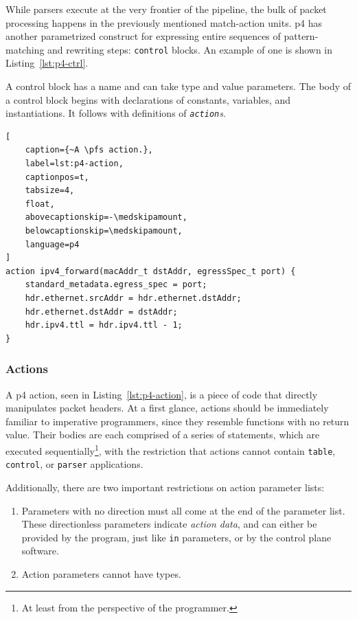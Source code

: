 While parsers execute at the very frontier of the pipeline, the bulk of packet
processing happens in the previously mentioned match-action units. \acrshort{p4}
has another parametrized construct for expressing entire sequences of
pattern-matching and rewriting steps: \texttt{control} blocks. An example of one
is shown in Listing~\ref{lst:p4-ctrl}.

A control block has a name and can take type and value parameters. The body of a
control block begins with declarations of constants, variables, and
instantiations. It follows with definitions of \emph{\texttt{action}s}.

\begin{lstlisting}[
	caption={~A \pfs action.},
	label=lst:p4-action,
	captionpos=t,
	tabsize=4,
	float,
	abovecaptionskip=-\medskipamount,
	belowcaptionskip=\medskipamount,
	language=p4
]
action ipv4_forward(macAddr_t dstAddr, egressSpec_t port) {
	standard_metadata.egress_spec = port;
	hdr.ethernet.srcAddr = hdr.ethernet.dstAddr;
	hdr.ethernet.dstAddr = dstAddr;
	hdr.ipv4.ttl = hdr.ipv4.ttl - 1;
}
\end{lstlisting}

\subsubsection*{Actions}

A \acrshort{p4} action, seen in Listing~\ref{lst:p4-action}, is a piece of code
that directly manipulates packet headers. At a first glance, actions should be
immediately familiar to imperative programmers, since they resemble functions
with no return value. Their bodies are each comprised of a series of statements,
which are executed sequentially\footnote{At least from the perspective of the
programmer.}, with the restriction that actions cannot contain \texttt{table},
\texttt{control}, or \texttt{parser} applications.

Additionally, there are two important restrictions on action parameter lists:

\begin{enumerate}
	\item Parameters with no direction must all come at the end of the parameter
	list. These directionless parameters indicate \emph{action data}, and can
	either be provided by the program, just like \texttt{in} parameters, or by
	the control plane software.
	\item Action parameters cannot have \extern{} types.
\end{enumerate}


